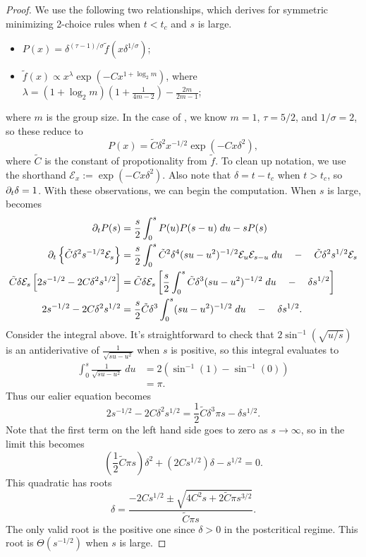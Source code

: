 \documentclass[twoside,10pt]{article}
\begin{document}
\begin{proof}
	We use the following two relationships, which \cite{daCosta} derives for symmetric minimizing 2-choice rules when $t < t_c$ and $s$ is large.
\begin{itemize}
        \item $P(x) = \delta^{(\tau-1)/\sigma} \tilde{f}(x \delta^{1/\sigma})$;
        \item $\tilde{f}(x) \propto x^{\lambda} \exp\left( -Cx^{1 + \log_2 m} \right)$, where $\lambda = (1+\log_2 m)\left( 1 + \frac{1}{4m-2}  \right)-\frac{2m}{2m-1} $;
\end{itemize}
where $m$ is the group size. In the case of \ER, we know $m=1$, $\tau=5/2$, and $1/\sigma = 2$, so these reduce to
\[
        P(x) = \tilde{C} \delta^{2} x^{-1/2} \exp\left( -Cx \delta^{2} \right),
\]
where $ \tilde{C}$ is the constant of propotionality from $\tilde{f}$. To clean up notation, we use the shorthand $\mathcal{E}_x := \exp\left( -C x \delta^{2} \right)$. Also note that $\delta = t-t_c$ when $t > t_c$, so $\partial_{t}{\delta} =1$. With these observations, we can begin the computation. When $s$ is large,  becomes
\begin{align*}
        \partial_{t}{P}(s) &= \frac{s}{2} \int_{0}^{s} P(u)P(s-u)\;du - sP(s) \\
        \partial_{t}\left\{ \tilde{C} \delta^{2}s^{-1/2}\mathcal{E}_{s} \right\} &= \frac{s}{2} \int_{0}^{s} \tilde{C}^{2}\delta^{4}(su-u^2)^{-1/2} \mathcal{E}_{u}\mathcal{E}_{s-u} \; du \quad-\quad \tilde{C}\delta^{2}s^{1/2}\mathcal{E}_{s} \\
        \tilde{C} \delta \mathcal{E}_{s} \left[ 2s^{-1/2} - 2C\delta^{2}s^{1/2} \right] &= \tilde{C} \delta \mathcal{E}_{s} \left[ \frac{s}{2} \int_{0}^{s} \tilde{C}\delta^{3}(su-u^2)^{-1/2}  \; du \quad-\quad \delta s^{1/2} \right] \\
	2s^{-1/2} - 2C \delta^{2}s^{1/2} &= \frac{s}{2} \tilde{C} \delta^3 \int_{0}^{s} (su-u^2)^{-1/2}\;du \quad-\quad \delta s^{1/2}.
\end{align*}
	Consider the integral above. It's straightforward to check that $2\sin^{-1}(\sqrt{u/s} )$ is an antiderivative of $\frac{1}{\sqrt{su-u^2} } $ when $s$ is positive, so this integral evaluates to
	\begin{align*}
		\int_{0}^{s} \frac{1}{\sqrt{su-u^2} }\;du &= 2 \left( \sin^{-1}(1)-\sin^{-1}(0) \right) \\
							  &= \pi.
	\end{align*}
	Thus our ealier equation becomes
	\[
		2s^{-1/2} - 2C\delta^{2}s^{1/2} = \frac{1}{2} \tilde{C} \delta^{3} \pi s - \delta s^{1/2}.
	\]
        Note that the first term on the left hand side goes to zero as $s\to \infty$, so in the limit this becomes
	\[
		\left( \frac{1}{2} \tilde{C} \pi s \right)\delta^{2} + \left( 2C s^{1/2} \right)\delta - s^{1/2} =0.
	\]
	This quadratic has roots
	\[
	\delta = \frac{-2C s^{1/2} \pm \sqrt{4 C^2 s + 2 \tilde{C} \pi s^{3/2}} }{\tilde{C} \pi s}.
	\]
	The only valid root is the positive one since $\delta >0$ in the postcritical regime. This root is $\Theta(s^{-1/2})$ when $s$ is large.
\end{proof}
\end{document}
